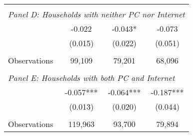{\begin{tabular}{lccc}
&  &  &   \\
\multicolumn{4}{l}{\textit{Panel D: Households with neither PC nor Internet}} \\
\hspace{3mm}        &      -0.022   &      -0.043*  &      -0.073   \\
                    &     (0.015)   &     (0.022)   &     (0.051)   \\
                    &               &               &               \\
\hspace{3mm}Observations&      99,109   &      79,201   &      68,096   \\
 
&  &  &   \\
\multicolumn{4}{l}{\textit{Panel E: Households with both PC and Internet}} \\
\hspace{3mm}        &      -0.057***&      -0.064***&      -0.187***\\
                    &     (0.013)   &     (0.020)   &     (0.044)   \\
                    &               &               &               \\
\hspace{3mm}Observations&     119,963   &      93,700   &      79,894   \\
 

\bottomrule
\end{tabular}
}
